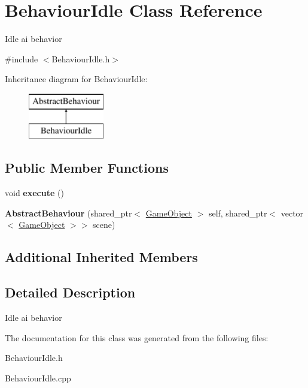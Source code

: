 \hypertarget{class_behaviour_idle}{}\section{Behaviour\+Idle Class Reference}
\label{class_behaviour_idle}


Idle ai behavior  




{\ttfamily \#include $<$Behaviour\+Idle.\+h$>$}

Inheritance diagram for Behaviour\+Idle\+:\begin{figure}[H]
\begin{center}
\leavevmode
\includegraphics[height=2.000000cm]{class_behaviour_idle}
\end{center}
\end{figure}
\subsection*{Public Member Functions}
\begin{DoxyCompactItemize}
\item 
\mbox{\label{class_behaviour_idle_ac810c315b1ea41772060b216ecdc2e11}} 
void {\bfseries execute} ()
\item 
\mbox{\label{class_behaviour_idle_a8a3a9217b3179f949a1d6a32f340c00c}} 
{\bfseries Abstract\+Behaviour} (shared\+\_\+ptr$<$ \mbox{\hyperlink{class_game_object}{Game\+Object}} $>$ self, shared\+\_\+ptr$<$ vector$<$ \mbox{\hyperlink{class_game_object}{Game\+Object}} $>$$>$ scene)
\end{DoxyCompactItemize}
\subsection*{Additional Inherited Members}


\subsection{Detailed Description}
Idle ai behavior 



The documentation for this class was generated from the following files\+:\begin{DoxyCompactItemize}
\item 
Behaviour\+Idle.\+h\item 
Behaviour\+Idle.\+cpp\end{DoxyCompactItemize}
